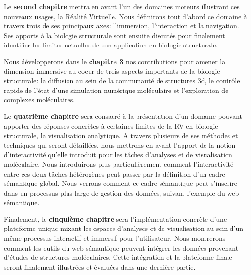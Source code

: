 Le \textbf{second chapitre} mettra en avant l'un des domaines moteurs illustrant ces nouveaux usages, la Réalité Virtuelle. Nous définirons tout d'abord ce domaine à travers trois de ses principaux axes: l'immersion, l'interaction et la navigation. Ses apports à la biologie structurale sont ensuite discutés pour finalement identifier les limites actuelles de son application en biologie structurale.

Nous développerons dans le \textbf{chapitre 3} nos contributions pour amener la dimension immersive au coeur de trois aspects importants de la biologie structurale: la diffusion au sein de la communauté de structures 3d, le contrôle rapide de l'état d'une simulation numérique moléculaire et l'exploration de complexes moléculaires.

Le \textbf{quatrième chapitre} sera consacré à la présentation d'un domaine pouvant apporter des réponses concrètes à certaines limites de la RV en biologie structurale, la visualisation analytique. A travers plusieurs de ses méthodes et techniques qui seront détaillées, nous mettrons en avant l'apport de la notion d'interactivité qu'elle introduit pour les tâches d'analyses et de visualisation moléculaire. Nous introduirons plus particulièrement comment l'interactivité entre ces deux tâches hétérogènes peut passer par la définition d'un cadre sémantique global. Nous verrons comment ce cadre sémantique peut s'inscrire dans un processus plus large de gestion des données, suivant l'exemple du web sémantique.

Finalement, le \textbf{cinquième chapitre} sera l'implémentation concrète d'une plateforme unique mixant les espaces d'analyses et de visualisation au sein d'un même processus interactif et immersif pour l'utilisateur. Nous montrerons comment les outils du web sémantique peuvent intégrer les données provenant d'études de structures moléculaires. Cette intégration et la plateforme finale seront finalement illustrées et évaluées dans une dernière partie.